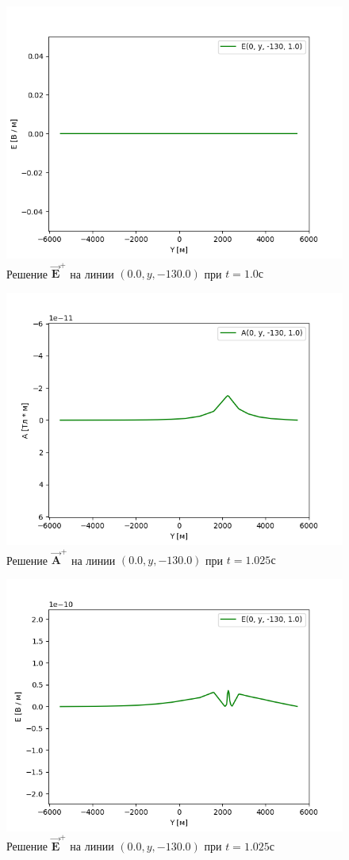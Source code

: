\begin{figure}
	\centering
	\includegraphics[width=0.5\linewidth]{images/Normal_E(y)_1.png}
	\caption{Решение $\overrightarrow{\textbf{E}}^+$ на линии $(0.0, y, -130.0)$ при $t = 1.0с$}
	\label{fig:E_line_t0}
\end{figure} 

\begin{figure}
	\centering
	\includegraphics[width=0.5\linewidth]{images/Normal_A(y)_2.png}
	\caption{Решение $\overrightarrow{\textbf{A}}^+$ на линии $(0.0, y, -130.0)$ при $t = 1.025с$}
	\label{fig:A_line_t1}
\end{figure} 

\begin{figure}
	\centering
	\includegraphics[width=0.5\linewidth]{images/Normal_E(y)_2.png}
	\caption{Решение $\overrightarrow{\textbf{E}}^+$ на линии $(0.0, y, -130.0)$  при $t = 1.025с$}
	\label{fig:E_line_t1}
\end{figure} 

